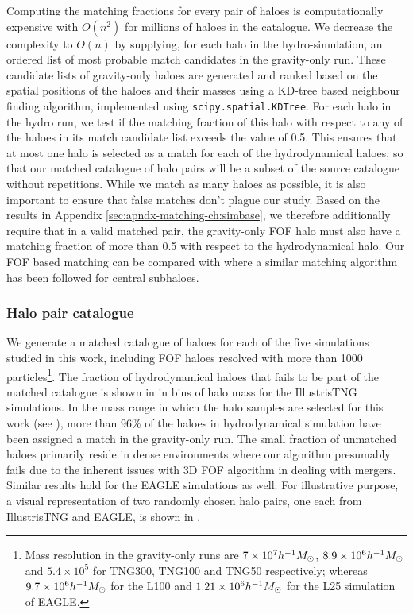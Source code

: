 Computing the matching fractions 
for every pair of haloes is computationally expensive with $O(n^2)$ for millions of haloes in the catalogue. We decrease the complexity to $O(n)$ by supplying, for each halo in the hydro-simulation, an ordered list of most probable match candidates in the gravity-only run. These candidate lists of gravity-only haloes are generated and ranked based on the spatial positions of the haloes and their masses using a KD-tree based neighbour finding algorithm, implemented using \texttt{scipy.spatial.KDTree}.
For each halo in the hydro run, we test if the matching fraction of this halo with respect to any of the haloes in its match candidate list exceeds the value of 0.5. This ensures that at most one halo is selected as a match for each of the hydrodynamical haloes, so that our matched catalogue of halo pairs will be a subset of the source catalogue without repetitions.
While we match as many haloes as possible, it is also important to ensure that false matches don't plague our study. Based on the results in Appendix \ref{sec:apndx-matching-ch:simbase}, we therefore additionally require that in a valid matched pair, the gravity-only FOF halo must also have a matching fraction of more than 0.5 with respect to the hydrodynamical halo.
Our FOF based matching can be compared with
\citet[][]{2018MNRAS.481.1950L} where a similar matching algorithm has been followed for central subhaloes.

\subsubsection{Halo pair catalogue}
We generate a matched catalogue of haloes for each of the five simulations studied in this work, including FOF haloes resolved with more than 1000 particles\footnote{Mass resolution in the gravity-only runs are $7 \times 10^7 h^{-1}M_{\odot}$, $8.9 \times 10^6 h^{-1}M_{\odot}$ and $5.4 \times 10^5$ for TNG300, TNG100 and TNG50 respectively; whereas $9.7 \times 10^6 h^{-1}M_{\odot}$ for the L100 and $1.21 \times 10^6 h^{-1}M_{\odot}$ for the L25 simulation of EAGLE.}. The fraction of hydrodynamical haloes that fails to be part of the matched catalogue is shown in  in bins of halo mass for the IllustrisTNG simulations. %
In the mass range in which the halo samples are selected for this work (see ), more than 96\% of the haloes in hydrodynamical simulation have been assigned a match in the gravity-only run. The small fraction of unmatched haloes primarily reside in dense environments 
where our algorithm presumably fails due to
the inherent issues with 3D FOF algorithm in dealing with mergers. Similar results hold for the EAGLE simulations as well. 
For illustrative purpose, a visual representation of two randomly chosen halo pairs, one each from IllustrisTNG and EAGLE, is shown in . 










